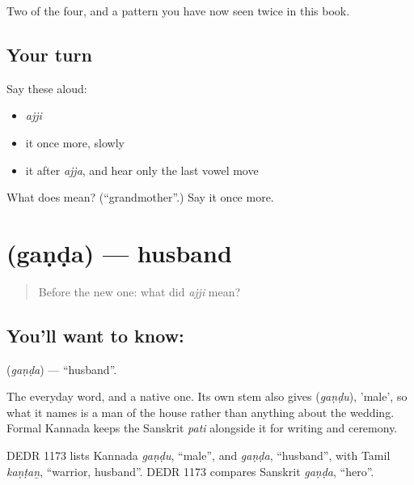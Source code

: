 \begin{grammarlens}[title={What you've built}]
Two of the four, and a pattern you have now seen twice in this book.
\end{grammarlens}

\subsection*{Your turn}
Say these aloud:

\begin{itemize}
\raggedright
  \item \emph{ajji}
  \item it once more, slowly
  \item it after \emph{ajja}, and hear only the last vowel move
\end{itemize}

\begin{tcolorbox}[breakable,colback=teal!4,colframe=teal!35!black,title={Before you move on}]
What does  mean? (\textquotedblleft{}grandmother\textquotedblright{}.) Say it once more.
\end{tcolorbox}
\section[\texorpdfstring{\kn{ಗಂಡ} (gaṇḍa)}{ಗಂಡ (gaṇḍa)}]{ (gaṇḍa) — husband}

\label{lesson:KA-C45-husband}



\begin{quote}
Before the new one: what did \emph{ajji} mean?
\end{quote}

\subsection*{You'll want to know: }
\textbf{} (\emph{gaṇḍa}) — \textquotedblleft{}husband\textquotedblright{}.

The everyday word, and a native one. Its own stem also gives  (\emph{gaṇḍu}), 'male', so what it names is a man of the house rather than anything about the wedding. Formal Kannada keeps the Sanskrit \emph{pati} alongside it for writing and ceremony.

DEDR 1173 lists Kannada \emph{gaṇḍu}, \textquotedblleft{}male\textquotedblright{}, and \emph{gaṇḍa}, \textquotedblleft{}husband\textquotedblright{}, with Tamil \emph{kaṇṭaṉ}, \textquotedblleft{}warrior, husband\textquotedblright{}. DEDR 1173 compares Sanskrit \emph{gaṇḍa}, \textquotedblleft{}hero\textquotedblright{}.

